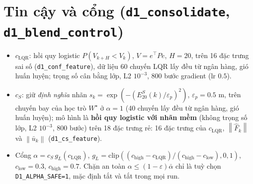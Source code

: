 \documentclass[11pt]{article}
\newcommand{\T}{^{\!\top}}
\newcommand{\norm}[1]{\left\lVert #1 \right\rVert}
\newcommand{\cS}{c_{S}}
\newcommand{\cL}{c_{\mathrm{LQR}}}
\begin{document}
\section{Tin cậy và cổng (\texttt{d1\_consolidate}, \texttt{d1\_blend\_control})}
\begin{itemize}[leftmargin=1.4em,itemsep=1pt]
\item $\cL$: hồi quy logistic $P(V_{k+H}<V_k)$, $V=e\T Pe$, $H=20$, trên 16 đặc trưng sai số (\texttt{d1\_conf\_feature}),
dữ liệu 60 chuyến LQR lấy đều từ ngân hàng, gió huấn luyện; trọng số cân bằng lớp, L2 $10^{-3}$, 800 bước gradient (lr $0.5$).
\item $\cS$: giữ \emph{định nghĩa} nhãn $s_k=\exp(-(E^S_{20}(k)/\varepsilon_p)^2)$, $\varepsilon_p=0.5$ m, trên chuyến bay của
học trò $W^\star$ ở $\alpha=1$ (40 chuyến lấy đều từ ngân hàng, gió huấn luyện); mô hình là \textbf{hồi quy logistic với nhãn
mềm} (không trọng số lớp, L2 $10^{-3}$, 800 bước) trên 18 đặc trưng rẻ: 16 đặc trưng của $\cL$, $\norm{\hat F_k}$ và
$\norm{\bar u_k}$ (\texttt{d1\_cs\_feature}).
\item Cổng $\alpha=\cS\,g_L(\cL)$, $g_L=\mathrm{clip}((c_{\mathrm{high}}-\cL)/(c_{\mathrm{high}}-c_{\mathrm{low}}),0,1)$,
$c_{\mathrm{low}}=0.3$, $c_{\mathrm{high}}=0.7$. Chặn an toàn $\alpha\le(1-\varepsilon)\bar\alpha$ chỉ là tuỳ chọn
\texttt{D1\_ALPHA\_SAFE=1}, mặc định tắt và tắt trong mọi run.
\end{itemize}
\end{document}
